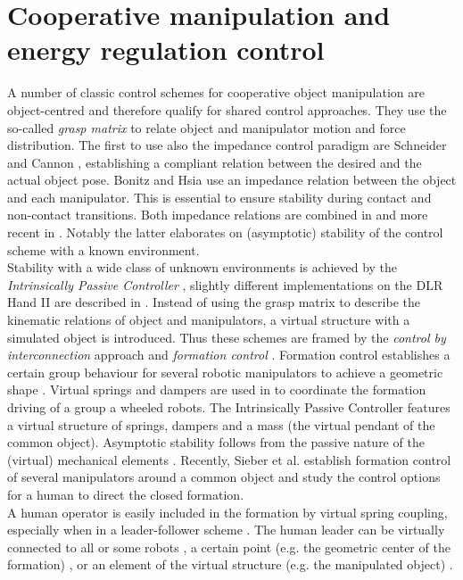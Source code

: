 \documentclass[a4paper,twoside, openright,12pt]{report}
\begin{document}
\section{Cooperative manipulation and energy regulation control}
A number of classic control schemes for cooperative object manipulation are object-centred and therefore qualify for shared control approaches. They use the so-called \emph{grasp matrix} to relate object and manipulator motion and force distribution. The first to use also the impedance control paradigm \cite{Hogan_84} are Schneider and Cannon \cite{Schneider_92}, establishing a compliant relation between the desired and the actual object pose. Bonitz and Hsia \cite{Bonitz_96} use an impedance relation between the object and each manipulator. This is essential to ensure stability during contact and non-contact transitions. Both impedance relations are combined in \cite{Caccavale_01,Caccavale_08} and more recent in \cite{Heck_13}. Notably the latter elaborates on (asymptotic) stability of the control scheme with a known environment.\\
Stability with a wide class of unknown environments is achieved by the \emph{Intrinsically Passive Controller} \cite{Stramigioli_01}, slightly different implementations on the DLR Hand II are described in \cite{Wimboeck_06,Wimboeck_08}. Instead of using the grasp matrix to describe the kinematic relations of object and manipulators, a virtual structure with a simulated object is introduced. Thus these schemes are framed by the \emph{control by interconnection} approach \cite{Ortega_08}  and \emph{formation control} \cite{Lawton_03}. Formation control establishes a certain group behaviour for several robotic manipulators to achieve a geometric shape \cite{VosDiss_15}. Virtual springs and dampers are used in \cite{Vos_14} to coordinate the formation driving of a group a wheeled robots. The Intrinsically Passive Controller features a virtual structure of springs, dampers and a mass (the virtual pendant of the common object). Asymptotic stability follows from the passive nature of the (virtual) mechanical elements \cite{Stramigioli_15}. Recently, Sieber et al. \cite{Sieber_15} establish formation control of several manipulators around a common object and study the control options for a human to direct the closed formation. \\
A human operator is easily included in the formation by virtual spring coupling, especially when in a leader-follower scheme \cite{Scheggi_14}. The human leader can be virtually connected to all or some robots \cite{Sieber_15}, a certain point (e.g. the geometric center of the formation) \cite{Wimboeck_06}, or an element of the virtual structure (e.g. the manipulated object) \cite{Stramigioli_01}.\\
\end{document}
